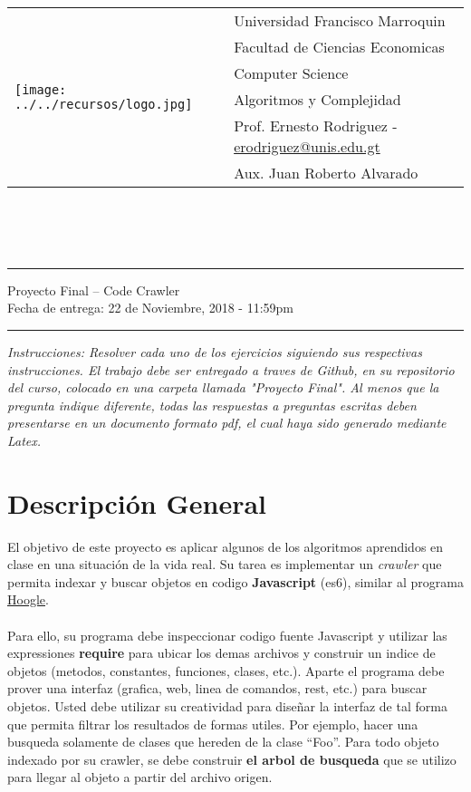 \documentclass{article}
\newcommand{\horrule}[1]{\rule{\linewidth}{#1}}
\begin{document}
\begin{tabular}{l l}
\multirow{6}{*}{\texttt{[image: ../../recursos/logo.jpg]}}
 & Universidad Francisco Marroquin \\
 & Facultad de Ciencias Economicas \\
 & Computer Science \\
 & Algoritmos y Complejidad \\
 & Prof. Ernesto Rodriguez - \href{mailto:erodriguez@unis.edu.gt}{erodriguez@unis.edu.gt} \\
 & Aux. Juan Roberto Alvarado
\end{tabular}
\\\\\\

\begin{center}
        \horrule{0.5pt}
        \huge{Proyecto Final -- Code Crawler} \\
        \large{Fecha de entrega: 22 de Noviembre, 2018 - 11:59pm} \\
        \horrule{1pt}
\end{center}

\emph{Instrucciones: Resolver cada uno de los ejercicios siguiendo sus respectivas
instrucciones. El trabajo debe ser entregado a traves de Github, en su repositorio del curso, colocado en una
carpeta llamada "Proyecto Final". Al menos que la pregunta indique diferente, todas las
respuestas a preguntas escritas deben presentarse en un documento formato pdf, el cual
haya sido generado mediante Latex. }
\section{Descripci\'on General}
El objetivo de este proyecto es aplicar algunos de los algoritmos aprendidos en clase en
una situaci\'on de la vida real. Su tarea es implementar un \emph{crawler} que permita
indexar y buscar objetos en codigo {\bf Javascript} (es6), similar al programa \href{https://www.haskell.org/hoogle/}{Hoogle}.
\\\\
Para ello, su programa debe inspeccionar codigo fuente Javascript y utilizar las expressiones
{\bf require} para ubicar los demas archivos y construir un indice de objetos (metodos, constantes,
funciones, clases, etc.). Aparte el programa debe prover una interfaz (grafica, web, linea de comandos,
rest, etc.) para buscar objetos. Usted debe utilizar su creatividad para dise\~nar la interfaz de
tal forma que permita filtrar los resultados de formas utiles. Por ejemplo, hacer una busqueda solamente
de clases que hereden de la clase ``Foo''. Para todo objeto indexado por su crawler, se debe construir
{\bf el arbol de busqueda} que se utilizo para llegar al objeto a partir del archivo origen.
\end{document}
